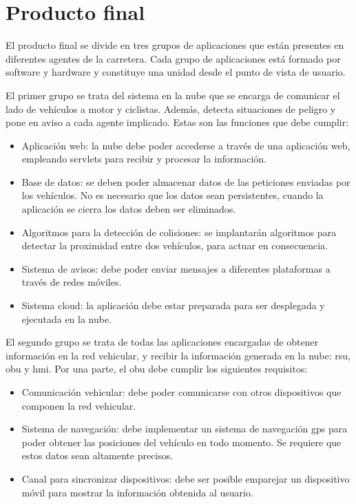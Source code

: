 \section{Producto final}
El producto final se divide en tres grupos de aplicaciones que están presentes
en diferentes agentes de la carretera. Cada grupo de aplicaciones está formado
por software y hardware y constituye una unidad desde el punto de vista de
usuario.

El primer grupo se trata del sistema en la nube que se encarga de comunicar el
lado de vehículos a motor y ciclistas. Además, detecta situaciones de peligro y
pone en aviso a cada agente implicado. Estas son las funciones que debe cumplir:
\begin{itemize}
	\item Aplicación web: la nube debe poder accederse a través de una aplicación
	web, empleando servlets para recibir y procesar la información.

	\item Base de datos: se deben poder almacenar datos de las peticiones enviadas
	por los vehículos. No es necesario que los datos sean persistentes, cuando la
	aplicación	se cierra los datos deben ser eliminados.

	\item Algoritmos para la detección de colisiones: se implantarán algoritmos
	para detectar la proximidad entre dos vehículos, para actuar en consecuencia.

	\item Sistema de avisos: debe poder enviar mensajes a diferentes plataformas
	a través de redes móviles.

	\item Sistema cloud: la aplicación debe estar preparada para ser desplegada
	y ejecutada en la nube.
\end{itemize}

El segundo grupo se trata de todas las aplicaciones encargadas de obtener
información en la red vehicular, y recibir la información generada en la nube:
\gls{rsu}, \gls{obu} y \gls{hmi}. Por una parte, el \gls{obu} debe cumplir los
siguientes requisitos:

\begin{itemize}
	\item Comunicación vehicular: debe poder comunicarse con otros dispositivos
	que	componen la red vehicular.

	\item Sistema de navegación: debe implementar un sistema de navegación
	\gls{gps} para poder obtener las posiciones del vehículo en todo momento. Se
	requiere que estos datos sean altamente precisos.

	\item Canal para sincronizar dispositivos: debe ser posible emparejar un
	dispositivo móvil para mostrar la información obtenida al usuario.
\end{itemize}


